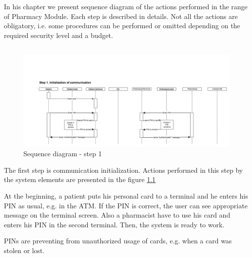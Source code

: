 \setcounter{page}{22}

\chapter{   }
In his chapter we present sequence diagram of the actions performed in the range of Pharmacy Module. Each step is described in details. Not all the actions are obligatory, i.e. some procedures can be performed or omitted depending on the required security level and a budget. 

\section{}
\begin{figure}	
	\hspace*{-1.5in}
    \includegraphics[scale=0.45]{s_d_1.png}
    \caption{Sequence diagram - step 1}
    \label{fig:s_q_step_1}
\end{figure} 

The first step is communication initialization. Actions performed in this step by the system elements are presented in the figure \ref{fig:s_q_step_1}

At the beginning, a patient puts his personal card to a terminal and he enters his PIN as usual, e.g. in the ATM. If the PIN is correct, the user can see appropriate message on the terminal screen. Also a pharmacist have to use his card and enters his PIN in the second terminal. Then, the system is ready to work. 

PINs are preventing from unauthorized usage of cards, e.g. when a card was stolen or lost.


